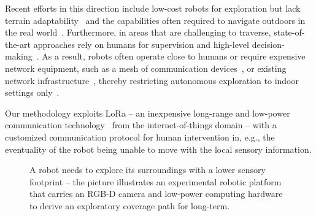 \documentclass[letterpaper,10pt,conference,twoside]{IEEEtran}
\theoremstyle{definition}
\begin{document}
Recent efforts in this direction include low-cost robots for exploration %
but lack terrain adaptability~\cite{muller2021openbot} and %
the capabilities often required to navigate outdoors in the real world~\cite{zhou2021smartphone,faisal2021low}. %
%
Furthermore, in areas that are %
challenging to traverse, %
state-of-the-art approaches rely on humans for supervision and high-level decision-making~\cite{tranzatto2022cerberus,roucek2020darpa,tabib2022autonomous}. 
As a result, robots often operate close to humans or require expensive network equipment, such as a mesh of communication devices~\cite{kulkarni2022autonomous,ebadi2020lamp}, or existing network infrastructure~\cite{khairuldanial2019mobile,%
voigtlander20175g}, thereby restricting autonomous exploration to indoor settings only~\cite{delgado2022oros,
cadena2016past,eldemiry2022autonomous,corah2019communication
}.

Our methodology exploits LoRa -- an inexpensive long-range and low-power communication technology~\cite{shanmuga2020survey} from the internet-of-things domain -- with a customized communication protocol 
for human intervention in, e.g., the eventuality of the robot being unable to move with the local sensory information. 

\begin{figure}
    \vspace*{-6.7cm}
    \hspace*{-.18cm}
     
   \caption{
     A robot needs to explore its surroundings with a lower sensory footprint -- %
     the picture illustrates an experimental robotic platform that carries an RGB-D camera and low-power computing hardware to derive an exploratory coverage path for %
     long-term. %
   }
   \vspace*{-.15cm}
   \label{fig:0}
 \end{figure}
\end{document}
